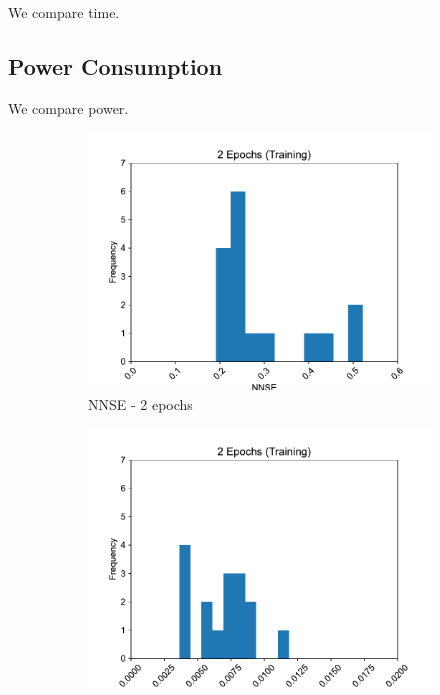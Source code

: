 \documentclass[11pt,twocolumn]{article}
\begin{document}
We compare time.

\subsection{Power Consumption}

We compare power.


\begin{figure}[p]
     \centering
     \begin{subfigure}[b]{0.49\textwidth}
        \centering\includegraphics[width=1.0\linewidth]{images/2_training-NNSE.pdf}
        \caption{NNSE - 2 epochs}
        \label{fig:tbd1}
     \end{subfigure}
     \hfill
     \begin{subfigure}[b]{0.49\textwidth}
        \centering\includegraphics[width=1.0\linewidth]{images/2_training-MSE.pdf}

\end{subfigure}
\end{figure}
\end{document}
